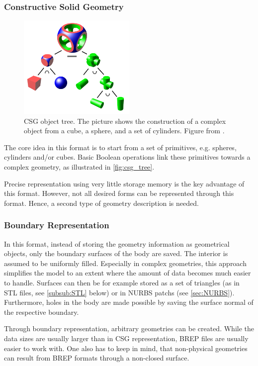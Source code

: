 \subsubsection{Constructive Solid Geometry}
\begin{figure}
\centering
\includegraphics[width=0.5\textwidth]{Pictures/Csg_tree.png}
\caption{\ac{CSG} object tree. The picture shows the construction of a complex object from a cube, a sphere, and a set of cylinders. Figure from \cite{WikipediaCSG}.}
\label{fig:csg_tree}
\end{figure}
The core idea in this format is to start from a set of primitives, e.g. spheres, cylinders and/or cubes. Basic Boolean operations link these primitives towards a complex geometry, as illustrated in \autoref{fig:csg_tree}.

Precise representation using very little storage memory is the key advantage of this format. However, not all desired forms can be represented through this format. Hence, a second type of geometry description is needed. 
\subsubsection{Boundary Representation}
In this format, instead of storing the geometry information as geometrical objects, only the boundary surfaces of the body are saved. The interior is assumed to be uniformly filled. Especially in complex geometries, this approach simplifies the model to an extent where the amount of data becomes much easier to handle. Surfaces can then be for example stored as a set of triangles (as in \ac{STL} files, see \autoref{subsub:STL} below) or in \ac{NURBS} \acsp{patch} (see \autoref{sec:NURBS}).
Furthermore, holes in the body are made possible by saving the surface normal of the respective boundary. 

Through boundary representation, arbitrary geometries can be created. While the data sizes are usually larger than in \ac{CSG} representation, \ac{BREP} files are usually easier to work with. One also has to keep in mind, that non-physical geometries can result from \ac{BREP} formats through a non-closed surface.

